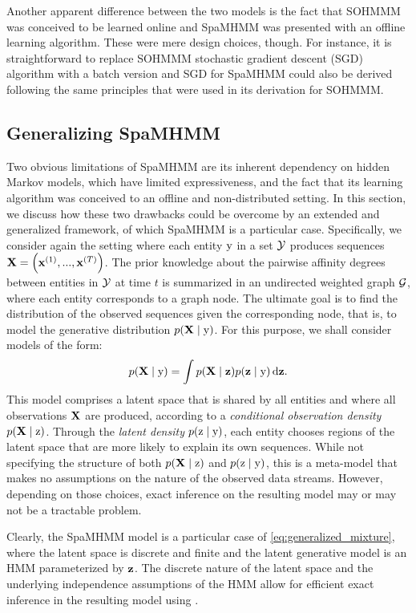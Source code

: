 Another apparent difference between the two models is the fact that SOHMMM was conceived to be learned online and SpaMHMM was presented with an offline learning algorithm. These were mere design choices, though. For instance, it is straightforward to replace SOHMMM stochastic gradient descent (SGD) algorithm with a batch version and SGD for SpaMHMM could also be derived following the same principles that were used in its derivation for SOHMMM.

\subsection{Generalizing SpaMHMM}

Two obvious limitations of SpaMHMM are its inherent dependency on hidden Markov models, which have limited expressiveness, and the fact that its learning algorithm was conceived to an offline and non-distributed setting. In this section, we discuss how these two drawbacks could be overcome by an extended and generalized framework, of which SpaMHMM is a particular case. Specifically, we consider again the setting where each entity ${\textnormal{y}}$ in a set ${\mathcal{Y}}$ produces sequences ${\mathbf{X}} = \left({\mathbf{x}}^{(1)}, ...,{\mathbf{x}}^{(T)} \right)$. The prior knowledge about the pairwise affinity degrees between entities in ${\mathcal{Y}}$ at time $t$ is summarized in an undirected weighted graph ${\mathcal{G}}$, where each entity corresponds to a graph node. The ultimate goal is to find the distribution of the observed sequences given the corresponding node, that is, to model the generative distribution $p({\mathbf{X}} \mid {\textnormal{y}})$. For this purpose, we shall consider models of the form:
\begin{equation}
    \label{eq:generalized_mixture}
    p({\mathbf{X}} \mid {\textnormal{y}}) = \int p({\mathbf{X}} \mid {\mathbf{z}}) p({\mathbf{z}} \mid {\textnormal{y}}) {\,\text{d}}{\mathbf{z}}.
\end{equation}
This model comprises a latent space that is shared by all entities and where all observations ${\mathbf{X}}$ are produced, according to a \textit{conditional observation density} $p({\mathbf{X}} \mid {\textnormal{z}})$. Through the \textit{latent density} $p({\textnormal{z}} \mid {\textnormal{y}})$, each entity chooses regions of the latent space that are more likely to explain its own sequences. While not specifying the structure of both $p({\mathbf{X}} \mid {\textnormal{z}})$ and $p({\textnormal{z}} \mid {\textnormal{y}})$, this is a meta-model that makes no assumptions on the nature of the observed data streams. However, depending on those choices, exact inference on the resulting model may or may not be a tractable problem.

Clearly, the SpaMHMM model is a particular case of \eqref{eq:generalized_mixture}, where the latent space is discrete and finite and the latent generative model is an HMM parameterized by ${\mathbf{z}}$. The discrete nature of the latent space and the underlying independence assumptions of the HMM allow for efficient exact inference in the resulting model using .


